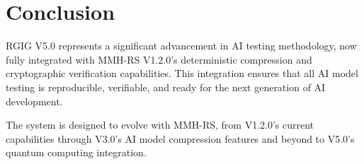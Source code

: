\documentclass[11pt]{article}
\begin{document}
\section*{Conclusion}
RGIG V5.0 represents a significant advancement in AI testing methodology, now fully integrated with MMH-RS V1.2.0's deterministic compression and cryptographic verification capabilities. This integration ensures that all AI model testing is reproducible, verifiable, and ready for the next generation of AI development.

The system is designed to evolve with MMH-RS, from V1.2.0's current capabilities through V3.0's AI model compression features and beyond to V5.0's quantum computing integration.
\end{document}
